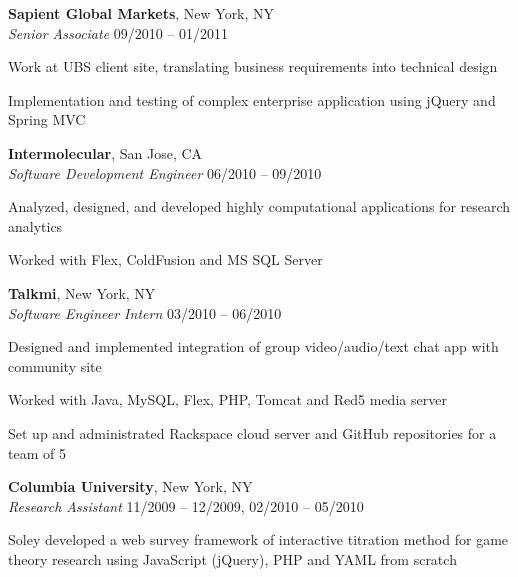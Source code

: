 \documentclass[margin,line]{resume}
\begin{document}
\begin{resume}
    \textbf{Sapient Global Markets}, New York, NY \\
    \textsl{Senior Associate} \hfill 09/2010 -- 01/2011 \vspace{-3mm}\\\vspace{-1mm}%
      \begin{list2}
      \item Work at UBS client site, translating business requirements into technical design
      \item Implementation and testing of complex enterprise application using jQuery and Spring MVC
      \end{list2}

    \textbf{Intermolecular}, San Jose, CA \\
    \textsl{Software Development Engineer} \hfill 06/2010 -- 09/2010 \vspace{-3mm}\\\vspace{-1mm}%
      \begin{list2}
      \item Analyzed, designed, and developed highly computational applications for research analytics
      \item Worked with Flex, ColdFusion and MS SQL Server
      \end{list2}

    \textbf{Talkmi}, New York, NY \\
    \textsl{Software Engineer Intern} \hfill 03/2010 -- 06/2010 \vspace{-3mm}\\\vspace{-1mm}%
      \begin{list2}
      \item Designed and implemented integration of group video/audio/text chat app with community site
      \item Worked with Java, MySQL, Flex, PHP, Tomcat and Red5 media server	    
      \item Set up and administrated Rackspace cloud server and GitHub repositories for a team of 5
      \end{list2}

    \textbf{Columbia University}, New York, NY \\
    \textsl{Research Assistant} \hfill 11/2009 -- 12/2009, 02/2010 -- 05/2010 \vspace{-3mm}\\\vspace{-1mm}%
      \begin{list2} 
      \item Soley developed a web survey framework of interactive titration method for game theory research using JavaScript (jQuery), PHP and YAML from scratch
      \end{list2}


\end{resume}
\end{document}
